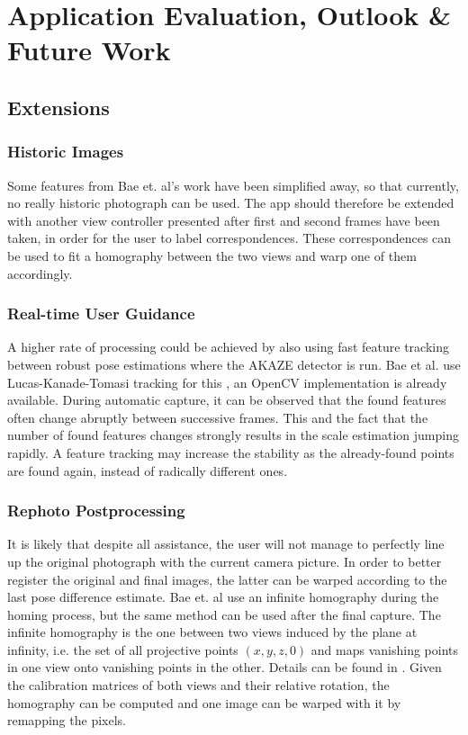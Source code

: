 \chapter{Application Evaluation, Outlook \& Future Work}\label{ch:outlook}

\section{Extensions}

\subsection*{Historic Images}

Some features from Bae et. al's work have been simplified away, so that
currently, no really historic photograph can be used. The app should therefore
be extended with another view controller presented after first and second frames
have been taken, in order for the user to label correspondences. These
correspondences can be used to fit a homography between the two views and warp
one of them accordingly.

\subsection*{Real-time User Guidance}

A higher rate of processing could be achieved by also using fast feature
tracking between robust pose estimations where the AKAZE detector is run. Bae et
al. use Lucas-Kanade-Tomasi tracking for this \citep{lucas1981,tomasi1991}, an
OpenCV implementation is already available. During automatic capture, it can be
observed that the found features often change abruptly between successive
frames. This and the fact that the number of found features changes strongly
results in the scale estimation jumping rapidly. A feature tracking may increase
the stability as the already-found points are found again, instead of radically
different ones.

\subsection*{Rephoto Postprocessing}

It is likely that despite all assistance, the user will not manage to
perfectly line up the original photograph with the current camera picture.  In
order to better register the original and final images, the latter can be warped
according to the last pose difference estimate. Bae et. al use an infinite
homography during the homing process, but the same method can be used after the
final capture. The infinite homography is the one between two views induced by
the plane at infinity, i.e.  the set of all projective points $(x,y,z,0)$ and
maps vanishing points in one view onto vanishing points in the other. Details
can be found in \citep[ch. 13.4]{h&z2004}.  Given the calibration matrices of
both views and their relative rotation, the homography can be computed and one
image can be warped with it by remapping the pixels.

